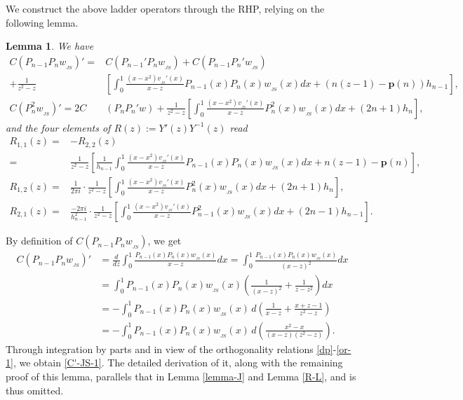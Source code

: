 \documentclass[12pt,a4paper]{article}    %
\makeatletter
\newtheorem{lemma}[theorem]{Lemma}
\renewenvironment{proof}[1][\proofname]{\par
	\pushQED{\qed}%
	\normalfont \topsep6\p@\@plus6\p@\relax
	\trivlist
	\item[\hskip\labelsep
	\itshape #1\@addpunct{.}]\ignorespaces
}{%
	\popQED\endtrivlist\@endpefalse
}
\numberwithin{equation}{section}
\makeatother
\begin{document}
We construct the above ladder operators through the RHP, relying on the following lemma.
\begin{lemma} We have
\begin{align}		 C(P_{n-1}P_nw_{_{JS}})'=&C(P_{n-1}'P_nw_{_{JS}})+C(P_{n-1}P_n'w_{_{JS}})\nonumber\\		 +\frac{1}{z^2-z}&\left[\int_{0}^{1}\frac{(x-x^2)v_{_{JS}}'(x)}{x-z}P_{n-1}(x)P_n(x)w_{_{JS}}(x)dx+\left(n(z-1)-\mathbf{p}(n)\right)h_{n-1}\right],\label{C'-JS-1}\\
C(P_n^2w_{_{JS}})'=2C&(P_nP_n'w)+\frac{1}{z^2-z}\left[\int_{0}^{1}\frac{(x-x^2)v_{_{JS}}'(x)}{x-z}P_n^2(x)w_{_{JS}}(x)dx+(2n+1)h_n\right],\nonumber
\end{align}
and the four elements of $R(z):=Y'(z)Y^{-1}(z)$ read
\begin{align*}		
R_{1,1}(z)=&-R_{2,2}(z)\\
=&\frac{1}{z^2-z}\left[\frac{1}{h_{n-1}}\int_{0}^{1}\frac{(x-x^2)v_{_{JS}}'(x)}{x-z}P_{n-1}(x)P_n(x)w_{_{JS}}(x)dx+n(z-1)-\mathbf{p}(n)\right],\\
R_{1,2}(z)=&\frac{1}{2\pi i}\cdot \frac{1}{z^2-z}\left[\int_{0}^{1}\frac{(x-x^2)v_{_{JS}}'(x)}{x-z}P_n^2(x)w_{_{JS}}(x)dx+(2n+1)h_n\right],\\
R_{2,1}(z)=&\frac{-2\pi i}{h_{n-1}^2}\cdot\frac{1}{z^2-z}\left[\int_{0}^{1}\frac{(x-x^2)v_{_{JS}}'(x)}{x-z}P_{n-1}^2(x)w_{_{JS}}(x)dx+(2n-1)h_{n-1}\right].
\end{align*}
\end{lemma}	
\begin{proof} By definition of $C(P_{n-1}P_nw_{_{JS}})$, we get
\begin{align*}
C(P_{n-1}P_nw_{_{JS}})' &=\frac{d}{dz}\int_{0}^{1}\frac{P_{n-1}(x)P_n(x)w_{_{JS}}(x)}{x-z}dx =\int_{0}^{1}\frac{P_{n-1}(x)P_n(x)w_{_{JS}}(x)}{(x-z)^2}dx \\		 &=\int_{0}^{1}P_{n-1}(x)P_n(x)w_{_{JS}}(x)\left(\frac{1}{(x-z)^2}+\frac{1}{z-z^2}\right)dx \\		 &=-\int_{0}^{1}P_{n-1}(x)P_n(x)w_{_{JS}}(x)\,d\left(\frac{1}{x-z}+\frac{x+z-1}{z^2-z}\right)\\
&=-\int_{0}^{1}P_{n-1}(x)P_n(x)w_{_{JS}}(x)\,d\left(\frac{x^2-x}{(x-z)(z^2-z)}\right).
\end{align*}
Through integration by parts and in view of the orthogonality relations \eqref{dp}-\eqref{or-1}, we obtain \eqref{C'-JS-1}. The detailed derivation of it, along with the remaining proof of this lemma, parallels that in Lemma \ref{lemma-J} and Lemma \ref{R-L}, and is thus omitted.
\end{proof}
\end{document}
